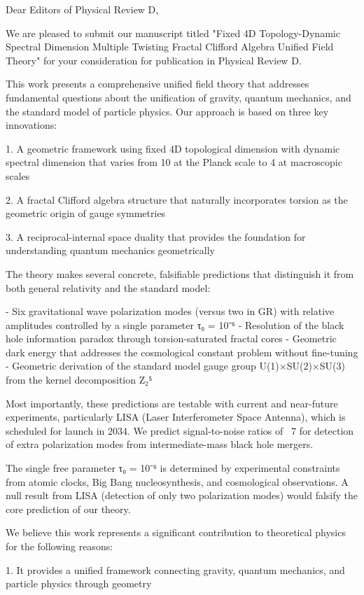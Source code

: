 Dear Editors of Physical Review D,

We are pleased to submit our manuscript titled "Fixed 4D Topology-Dynamic Spectral Dimension Multiple Twisting Fractal Clifford Algebra Unified Field Theory" for your consideration for publication in Physical Review D.

This work presents a comprehensive unified field theory that addresses fundamental questions about the unification of gravity, quantum mechanics, and the standard model of particle physics. Our approach is based on three key innovations:

1. A geometric framework using fixed 4D topological dimension with dynamic spectral dimension that varies from 10 at the Planck scale to 4 at macroscopic scales

2. A fractal Clifford algebra structure that naturally incorporates torsion as the geometric origin of gauge symmetries

3. A reciprocal-internal space duality that provides the foundation for understanding quantum mechanics geometrically

The theory makes several concrete, falsifiable predictions that distinguish it from both general relativity and the standard model:

- Six gravitational wave polarization modes (versus two in GR) with relative amplitudes controlled by a single parameter τ₀ = 10⁻⁶
- Resolution of the black hole information paradox through torsion-saturated fractal cores
- Geometric dark energy that addresses the cosmological constant problem without fine-tuning
- Geometric derivation of the standard model gauge group U(1)×SU(2)×SU(3) from the kernel decomposition Z₂⁵

Most importantly, these predictions are testable with current and near-future experiments, particularly LISA (Laser Interferometer Space Antenna), which is scheduled for launch in 2034. We predict signal-to-noise ratios of ~7 for detection of extra polarization modes from intermediate-mass black hole mergers.

The single free parameter τ₀ = 10⁻⁶ is determined by experimental constraints from atomic clocks, Big Bang nucleosynthesis, and cosmological observations. A null result from LISA (detection of only two polarization modes) would falsify the core prediction of our theory.

We believe this work represents a significant contribution to theoretical physics for the following reasons:

1. It provides a unified framework connecting gravity, quantum mechanics, and particle physics through geometry

